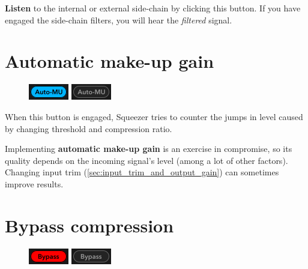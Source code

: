 \textbf{Listen} to the internal or external side-chain by clicking
this button.  If you have engaged the side-chain filters, you will
hear the \emph{filtered} signal.

\section{Automatic make-up gain}
\label{sec:buttons_automatic_makeup_gain}

\begin{figure}
  \includegraphics[scale=\screenshotscale,clip]{include/images/button_auto_makeup_gain_on.png}
  \newline \vspace{-0.9\baselineskip}
  \includegraphics[scale=\screenshotscale,clip]{include/images/button_auto_makeup_gain_off.png}
\end{figure}

When this button is engaged, Squeezer tries to counter the jumps in
level caused by changing threshold and compression ratio.

Implementing \textbf{automatic make-up gain} is an exercise in
compromise, so its quality depends on the incoming signal's level
(among a lot of other factors).  Changing input trim
(\ref{sec:input_trim_and_output_gain}) can sometimes improve results.

\newpage %

\section{Bypass compression}

\begin{figure}
  \includegraphics[scale=\screenshotscale,clip]{include/images/button_bypass_on.png}
  \newline \vspace{-0.9\baselineskip}
  \includegraphics[scale=\screenshotscale,clip]{include/images/button_bypass_off.png}
\end{figure}

